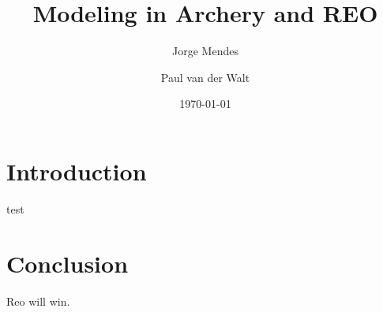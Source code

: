\documentclass[a4paper]{article}
\author{Jorge Mendes \and Paul van der Walt}
\date{\today}
\title{Modeling in Archery and REO}
\begin{document}
\maketitle

\section{Introduction}

test


\section{Conclusion}

Reo will win. 
\end{document}

